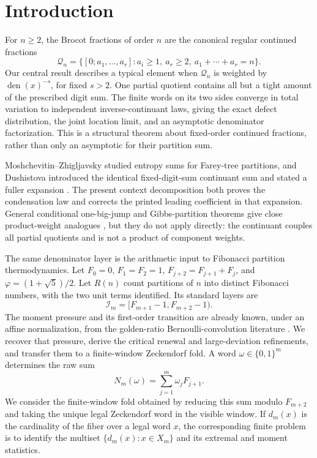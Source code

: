 \section{Introduction}\label{sec:introduction}

For \(n\ge2\), the Brocot fractions of order \(n\) are the canonical regular
continued fractions
\[
 \mathcal Q_n=\{[0;a_1,\ldots,a_r]:a_i\ge1,\ a_r\ge2,
                         \ a_1+\cdots+a_r=n\}.
\]
Our central result describes a typical element when \(\mathcal Q_n\) is
weighted by \(\operatorname{den}(x)^{-s}\), for fixed \(s>2\).  One partial
quotient contains all but a tight amount of the prescribed digit sum.  The
finite words on its two sides converge in total variation to independent
inverse-continuant laws, giving the exact defect distribution, the joint
location limit, and an asymptotic denominator factorization.  This is a
structural theorem about fixed-order continued fractions, rather than only
an asymptotic for their partition sum.

Moshchevitin--Zhigljavsky studied entropy sums for Farey-tree partitions,
and Dushistova introduced the identical fixed-digit-sum continuant sum and
stated a fuller expansion
\cite{MoshchevitinZhigljavsky2004,Dushistova2007}.  The present context
decomposition both proves the condensation law and corrects the printed
leading coefficient in that expansion.  General conditional one-big-jump
and Gibbs-partition theorems give close product-weight analogues
\cite{ArmendarizLoulakis2011,Stufler2020}, but they do not apply directly:
the continuant couples all partial quotients and is not a product of
component weights.

The same denominator layer is the arithmetic input to Fibonacci partition
thermodynamics.  Let \(F_0=0\), \(F_1=F_2=1\),
\(F_{j+2}=F_{j+1}+F_j\), and \(\varphi=(1+\sqrt5)/2\).  Let \(R(n)\) count
partitions of \(n\) into distinct Fibonacci numbers, with the two unit terms
identified.  Its standard layers are
\[
 \mathcal I_m=[F_{m+1}-1,F_{m+2}-1).
\]
The moment pressure and its first-order transition are already known, under
an affine normalization, from the golden-ratio Bernoulli-convolution
literature \cite{LauNgai1998,FengOlivier2003,Feng2005}.  We recover that
pressure, derive the critical renewal and large-deviation refinements, and
transfer them to a finite-window Zeckendorf fold.  A word
\(\omega\in\{0,1\}^m\) determines the raw sum
\[
  N_m(\omega)=\sum_{j=1}^m\omega_jF_{j+1}.
\]
We consider the finite-window fold obtained by reducing this sum modulo
\(F_{m+2}\) and taking the unique legal Zeckendorf word in the visible
window.  If \(d_m(x)\) is the cardinality of the fiber over a legal word
\(x\), the corresponding finite problem is to identify the multiset
\(\{d_m(x):x\in X_m\}\) and its extremal and moment statistics.

